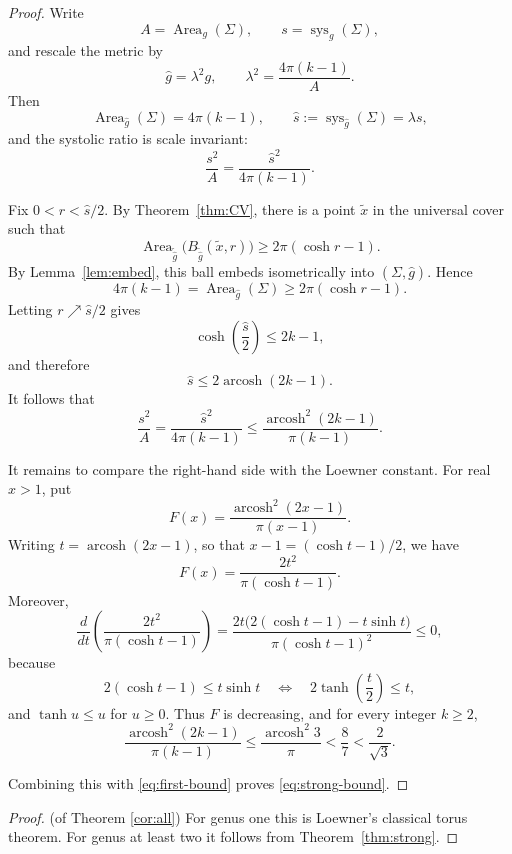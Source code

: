 \documentclass[11pt]{amsart}
\theoremstyle{remark}
\DeclareMathOperator{\Area}{Area}
\DeclareMathOperator{\sys}{sys}
\DeclareMathOperator{\arcosh}{arcosh}
\begin{document}
\begin{proof}
Write
\[
  A=\Area_g(\Sigma),
  \qquad
  s=\sys_g(\Sigma),
\]
and rescale the metric by
\[
  \widehat g=\lambda^2g,
  \qquad
  \lambda^2=\frac{4\pi(k-1)}{A}.
\]
Then
\[
  \Area_{\widehat g}(\Sigma)=4\pi(k-1),
  \qquad
  \widehat s:=\sys_{\widehat g}(\Sigma)=\lambda s,
\]
and the systolic ratio is scale invariant:
\[
  \frac{s^2}{A}
  =
  \frac{\widehat s^2}{4\pi(k-1)}.
\]

Fix $0<r<\widehat s/2$. By Theorem~\ref{thm:CV}, there is a point $\widetilde x$ in the universal cover such that
\[
  \Area_{\widetilde{\widehat g}}
  \bigl(B_{\widetilde{\widehat g}}(\widetilde x,r)\bigr)
  \geq 2\pi(\cosh r-1).
\]
By Lemma~\ref{lem:embed}, this ball embeds isometrically into $(\Sigma,\widehat g)$. Hence
\[
  4\pi(k-1)
  =\Area_{\widehat g}(\Sigma)
  \geq 2\pi(\cosh r-1).
\]
Letting $r\nearrow\widehat s/2$ gives
\[
  \cosh\!\left(\frac{\widehat s}{2}\right)\leq 2k-1,
\]
and therefore
\[
  \widehat s\leq 2\arcosh(2k-1).
\]
It follows that
\begin{equation}\label{eq:first-bound}
  \frac{s^2}{A}
  =\frac{\widehat s^2}{4\pi(k-1)}
  \leq
  \frac{\arcosh^2(2k-1)}{\pi(k-1)}.
\end{equation}

It remains to compare the right-hand side with the Loewner constant. For real $x>1$, put
\[
  F(x)=\frac{\arcosh^2(2x-1)}{\pi(x-1)}.
\]
Writing $t=\arcosh(2x-1)$, so that $x-1=(\cosh t-1)/2$, we have
\[
  F(x)=\frac{2t^2}{\pi(\cosh t-1)}.
\]
Moreover,
\[
  \frac{d}{dt}\left(\frac{2t^2}{\pi(\cosh t-1)}\right)
  =
  \frac{2t\bigl(2(\cosh t-1)-t\sinh t\bigr)}{\pi(\cosh t-1)^2}
  \leq0,
\]
because
\[
  2(\cosh t-1)\leq t\sinh t
  \quad\Longleftrightarrow\quad
  2\tanh\!\left(\frac t2\right)\leq t,
\]
and $\tanh u\leq u$ for $u\geq0$. Thus $F$ is decreasing, and for every integer $k\geq2$,
\[
  \frac{\arcosh^2(2k-1)}{\pi(k-1)}\leq \frac{\arcosh^2 3}{\pi}<\frac87<\frac{2}{\sqrt{3}}.
\]

Combining this with \eqref{eq:first-bound} proves \eqref{eq:strong-bound}.
\end{proof}

\begin{proof}(of Theorem \ref{cor:all})
For genus one this is Loewner's classical torus theorem. For genus at least two it follows from Theorem~\ref{thm:strong}.
\end{proof}
\end{document}

